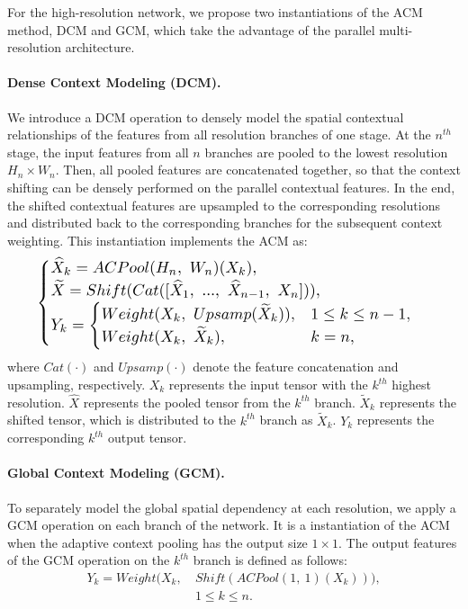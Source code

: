 \documentclass{article}
\begin{document}
For the high-resolution network, we propose two instantiations of the ACM method, DCM and GCM, which take the advantage of the parallel multi-resolution architecture.

\paragraph{Dense Context Modeling (DCM).} We introduce a DCM operation to densely model the spatial contextual relationships of the features from all resolution branches of one stage. At the $n^{th}$ stage, the input features from all $n$ branches are pooled to the lowest resolution $H_n \times W_n$. Then, all pooled features are concatenated together, so that the context shifting can be densely performed on the parallel contextual features. In the end, the shifted contextual features are upsampled to the corresponding resolutions and distributed back to the corresponding branches for the subsequent context weighting. This instantiation implements the ACM as:
\begin{equation}
    \begin{split}
    \resizebox{.91\linewidth}{!}{$
        \displaystyle
        \begin{cases}
            \widehat{X}_k = ACPool(H_n, \ W_n)(X_k),\\
            \widetilde{X} = Shift(Cat([\widehat{X}_1, \ ..., \ \widehat{X}_{n-1}, \ X_n])),\\
            Y_k = 
            \begin{cases}
                Weight(X_k, \ Upsamp(\widetilde{X}_k)), & 1 \leq k \leq n - 1,\\
                Weight(X_k, \ \widetilde{X}_k), & k = n,
            \end{cases}
        \end{cases}
    $}
    \end{split}
\end{equation}where $Cat(\cdot)$ and $Upsamp(\cdot)$ denote the feature concatenation and upsampling, respectively. $X_k$ represents the input tensor with the $k^{th}$ highest resolution. $\widehat{X}$ represents the pooled tensor from the $k^{th}$ branch. $\widetilde{X}_k$ represents the shifted tensor, which is distributed to the $k^{th}$ branch as $\widetilde{X}_k$. $Y_k$ represents the corresponding $k^{th}$ output tensor.

\paragraph{Global Context Modeling (GCM).} To separately model the global spatial dependency at each resolution, we apply a GCM operation on each branch of the network. It is a instantiation of the ACM when the adaptive context pooling has the output size $1 \times 1$. The output features of the GCM operation on the $k^{th}$ branch is defined as follows:
\begin{equation}
    \begin{split}
        Y_k = Weight(X_k, \ & Shift(ACPool(1, \ 1)(X_k))),\\
        & 1 \leq k \leq n.
    \end{split}
\end{equation}
\end{document}
